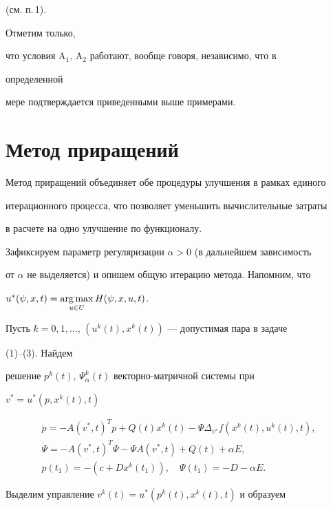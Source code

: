 (см. п.\,1). 


Отметим только, 


что условия A${}_1$, A${}_2$ работают, вообще говоря, независимо, что в 


определенной 


мере подтверждается приведенными выше примерами. 


 


\section{Метод приращений} 


 


Метод приращений объединяет обе процедуры улучшения в рамках единого


итерационного процесса, что позволяет уменьшить вычислительные затраты


в расчете на одно улучшение по функционалу. 


 


Зафиксируем параметр регуляризации $\alpha>0$ (в дальнейшем зависимость 


от $\alpha$ не выделяется) и опишем общую итерацию метода. Напомним, что 


$u^*(\psi,x,t)=\argmax\limits_{u\in U}H(\psi,x,u,t)$. 


 


Пусть $k=0,1,\dotsc$, $(u^k(t),x^k(t))$ --- допустимая пара в задаче 


(1)--(3). Найдем 


решение $p^k(t)$, $\Psi^k_\alpha(t)$ векторно-матричной системы при 


$v^*=u^*(p,x^k(t),t)$ 


\begin{gather*} 


\Dot p=-A(v^*,t)^T p+Q(t)x^k(t)-\Psi\Delta_{v^*} 


f(x^k(t),u^k(t),t),\\ 


\Dot\Psi=-A(v^*,t)^T\Psi-\Psi A(v^*,t)+Q(t)+\alpha E,\\ 


p(t_1)=-(c+D x^k(t_1)),\quad \Psi(t_1)=-D-\alpha E. 


\end{gather*} 


Выделим управление $v^k(t)=u^*(p^k(t),x^k(t),t)$ и образуем 



